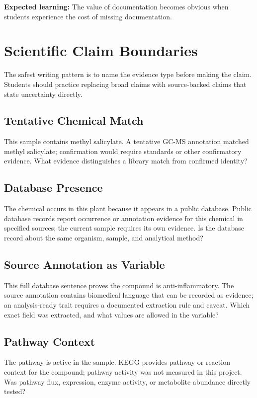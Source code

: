 \textbf{Expected learning:} The value of documentation becomes obvious when students experience the cost of missing documentation.

\section{Scientific Claim Boundaries}
The safest writing pattern is to name the evidence type before making the claim. Students should practice replacing broad claims with source-backed claims that state uncertainty directly.

\subsection{Tentative Chemical Match}
\SafeClaim
{This sample contains methyl salicylate.}
{A tentative GC-MS annotation matched methyl salicylate; confirmation would require standards or other confirmatory evidence.}
{What evidence distinguishes a library match from confirmed identity?}

\subsection{Database Presence}
\SafeClaim
{The chemical occurs in this plant because it appears in a public database.}
{Public database records report occurrence or annotation evidence for this chemical in specified sources; the current sample requires its own evidence.}
{Is the database record about the same organism, sample, and analytical method?}

\subsection{Source Annotation as Variable}
\SafeClaim
{This full database sentence proves the compound is anti-inflammatory.}
{The source annotation contains biomedical language that can be recorded as evidence; an analysis-ready trait requires a documented extraction rule and caveat.}
{Which exact field was extracted, and what values are allowed in the variable?}

\subsection{Pathway Context}
\SafeClaim
{The pathway is active in the sample.}
{KEGG provides pathway or reaction context for the compound; pathway activity was not measured in this project.}
{Was pathway flux, expression, enzyme activity, or metabolite abundance directly tested?}

